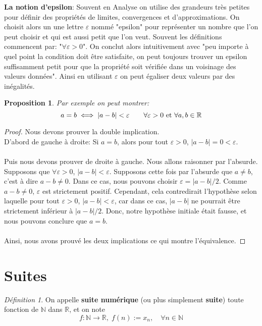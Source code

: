 \documentclass[oneside,12pt,french,table]{book}
\theoremstyle{definition}
\theoremstyle{plain}
\newtheorem{proposition}[definition]{Proposition}
\theoremstyle{remark}
\newtheorem{defi}[definition]{Définition}
\newcommand{\Nn}{{\mathbb{N}}}
\newcommand{\Rr}{{\mathbb{R}}}
\begin{document}
\textbf{La notion d'epsilon}: 
Souvent en Analyse on utilise des grandeurs très petites pour définir des propriétés de limites, convergences et d'approximations. On choisit alors un une lettre $\varepsilon$ nommé "epsilon" pour représenter un nombre que l'on peut choisir et qui est aussi petit que l'on veut. Souvent les définitions commencent par: "$\forall \varepsilon>0$". On conclut alors intuitivement avec "peu importe à quel point la condition doit être satisfaite, on peut toujours trouver un epsilon suffisamment petit pour que la propriété soit vérifiée dans un voisinage des valeurs données". Ainsi en utilisant $\varepsilon$ on peut égaliser deux valeurs par des inégalités. 

\begin{proposition}
    Par exemple on peut montrer:
\begin{equation}
    a=b \iff |a-b|<\varepsilon \qquad \forall \varepsilon>0 {\,\, \rm et\,\, }\forall a,b \in \Rr
\end{equation}
\end{proposition}
\begin{proof}
    Nous devons prouver la double implication. \\D'abord de gauche à droite: Si $a=b$, alors pour tout $\varepsilon>0$, $|a-b|=0<\varepsilon$.
\\ \\Puis nous devons prouver de droite à gauche. Nous allons raisonner par l'absurde. Supposons que $\forall \varepsilon>0$, $|a-b|<\varepsilon$. Supposons cette fois par l'absurde que $a\neq b$, c'est à dire $a-b\neq0$. Dans ce cas, nous pouvons choisir $\varepsilon = |a-b|/2$. Comme $a-b\neq 0$, $\varepsilon$ est strictement positif. Cependant, cela contredirait l'hypothèse selon laquelle pour tout $\varepsilon >0$, $|a-b|<\varepsilon$, car dans ce cas, $|a-b|$ ne pourrait être strictement inférieur à $|a-b|/2$. Donc, notre hypothèse initiale était fausse, et nous pouvons conclure que $a=b$.
\\ \\Ainsi, nous avons prouvé les deux implications ce qui montre l'équivalence.
\end{proof}



\section{Suites}
\begin{defi}
On appelle \textbf{suite numérique} (ou plus simplement \textbf{suite}) toute fonction de $\Nn$ dans $\Rr$, et on note 
\begin{equation}
    f: \Nn\longrightarrow\Rr,\; f(n):=x_n, \quad \forall n\in \Nn
\end{equation}
\end{defi}
\end{document}
